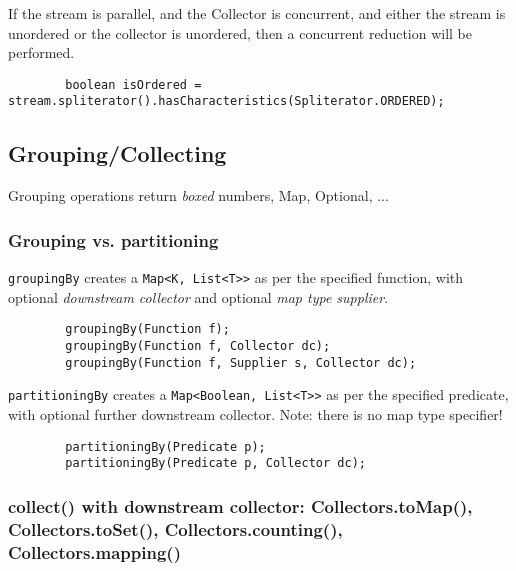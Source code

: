\documentclass{scrartcl}
\begin{document}
    If the stream is parallel, and the Collector is concurrent,
    and either the stream is unordered or the collector is unordered,
    then a concurrent reduction will be performed.

    \begin{lstlisting}
        boolean isOrdered = stream.spliterator().hasCharacteristics(Spliterator.ORDERED);
    \end{lstlisting}

\subsection{Grouping/Collecting}

    Grouping operations return \textit{boxed} numbers, Map, Optional, ...

\subsubsection{Grouping vs. partitioning}

    \lstinline{groupingBy} creates a \lstinline{Map<K, List<T>>} as per the specified function, with optional \textit{downstream collector} and optional \textit{map type supplier}.

    \begin{lstlisting}
        groupingBy(Function f);
        groupingBy(Function f, Collector dc);
        groupingBy(Function f, Supplier s, Collector dc);
    \end{lstlisting}

    \lstinline{partitioningBy} creates a \lstinline{Map<Boolean, List<T>>} as per the specified predicate, with optional further downstream collector.
    Note: there is no map type specifier!

    \begin{lstlisting}
        partitioningBy(Predicate p);
        partitioningBy(Predicate p, Collector dc);
    \end{lstlisting}

\subsubsection{collect() with downstream collector: Collectors.toMap(), Collectors.toSet(), Collectors.counting(), Collectors.mapping()}
\end{document}

